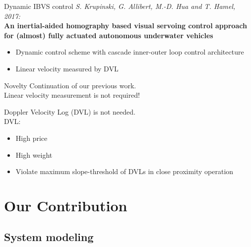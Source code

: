 \documentclass{beamer}
\begin{document}
%
%



\begin{frame}{Dynamic IBVS control}
\textit{S. Krupinski, G. Allibert, M.-D. Hua and T. Hamel, 2017:}\\ \textbf{An inertial-aided homography based visual servoing control approach for (almost) fully actuated autonomous underwater vehicles}
\begin{itemize}
	\item Dynamic control scheme with cascade inner-outer loop control architecture
\item Linear velocity measured by DVL 
\end{itemize}

\end{frame}

\begin{frame}{Novelty}
Continuation of our previous work. \\
Linear velocity measurement is not required!

Doppler Velocity Log (DVL) is not needed. \\
DVL:
\begin{itemize}
	\item High price
	\item High weight
	\item Violate maximum slope-threshold of DVLs in close proximity operation
\end{itemize}

\end{frame}


\section{Our Contribution}

\subsection{System modeling}
\end{document}
